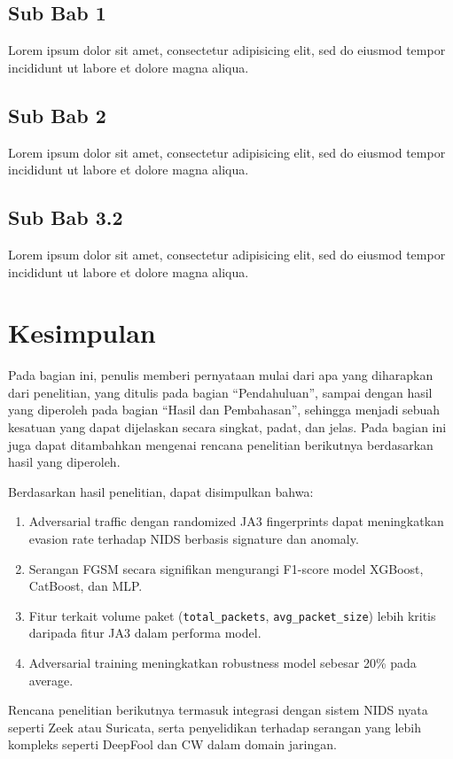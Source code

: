 \documentclass[10pt]{article}
\begin{document}
\subsection{Sub Bab 1}
Lorem ipsum dolor sit amet, consectetur adipisicing elit, sed do eiusmod tempor incididunt ut labore et dolore magna aliqua.

\subsection{Sub Bab 2}
Lorem ipsum dolor sit amet, consectetur adipisicing elit, sed do eiusmod tempor incididunt ut labore et dolore magna aliqua.

\subsection{Sub Bab 3.2}
Lorem ipsum dolor sit amet, consectetur adipisicing elit, sed do eiusmod tempor incididunt ut labore et dolore magna aliqua.

\section{Kesimpulan}
Pada bagian ini, penulis memberi pernyataan mulai dari apa yang diharapkan dari penelitian, yang ditulis pada bagian “Pendahuluan”, sampai dengan hasil yang diperoleh pada bagian “Hasil dan Pembahasan”, sehingga menjadi sebuah kesatuan yang dapat dijelaskan secara singkat, padat, dan jelas. Pada bagian ini juga dapat ditambahkan mengenai rencana penelitian berikutnya berdasarkan hasil yang diperoleh.

Berdasarkan hasil penelitian, dapat disimpulkan bahwa:
\begin{enumerate}
\item Adversarial traffic dengan randomized JA3 fingerprints dapat meningkatkan evasion rate terhadap NIDS berbasis signature dan anomaly.
\item Serangan FGSM secara signifikan mengurangi F1-score model XGBoost, CatBoost, dan MLP.
\item Fitur terkait volume paket (\texttt{total\_packets}, \texttt{avg\_packet\_size}) lebih kritis daripada fitur JA3 dalam performa model.
\item Adversarial training meningkatkan robustness model sebesar 20\% pada average.
\end{enumerate}
Rencana penelitian berikutnya termasuk integrasi dengan sistem NIDS nyata seperti Zeek atau Suricata, serta penyelidikan terhadap serangan yang lebih kompleks seperti DeepFool dan CW dalam domain jaringan.
\end{document}
